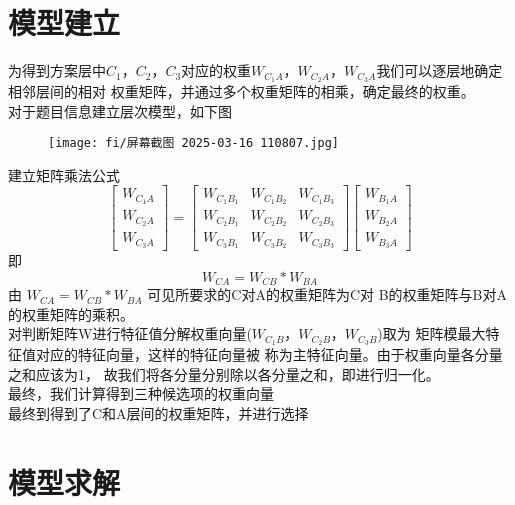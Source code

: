 \documentclass{article}
\begin{document}
\section{模型建立}
为得到方案层中$C_1$，$C_2$，$C_3$对应的权重$W_{C_1A}$，$W_{C_2A}$，$W_{C_3A}$我们可以逐层地确定相邻层间的相对
权重矩阵，并通过多个权重矩阵的相乘，确定最终的权重。
\\ \indent 对于题目信息建立层次模型，如下图
\begin{figure}[h]
    \centering
    \texttt{[image: fi/屏幕截图 2025-03-16 110807.jpg]}
\end{figure}
建立矩阵乘法公式
\begin{equation}
    \left[
    \begin{array}{c}
    W_{C_1A} \\
    W_{C_2A} \\
    W_{C_3A}
    \end{array}
    \right]
    =
    \left[
    \begin{array}{ccc}
    W_{C_1B_1} & W_{C_1B_2} & W_{C_1B_3} \\
    W_{C_2B_1} & W_{C_2B_2} & W_{C_2B_3} \\
    W_{C_3B_1} & W_{C_3B_2} & W_{C_3B_3}
    \end{array}
    \right]
    \left[
    \begin{array}{c}
    W_{B_1A} \\ 
    W_{B_2A} \\
    W_{B_3A}
    \end{array}
    \right]
    \end{equation}
即
\begin{equation}
  W_{CA}=W_{CB}*W_{BA}
\end{equation}
由 $W_{CA}=W_{CB}*W_{BA}$ 可见所要求的C对A的权重矩阵为C对
B的权重矩阵与B对A的权重矩阵的乘积。
\\ \indent 对判断矩阵W进行特征值分解权重向量($W_{C_1B}$，$W_{C_2B}$，$W_{C_3B}$)取为
矩阵模最大特征值对应的特征向量，这样的特征向量被
称为主特征向量。由于权重向量各分量之和应该为1，
故我们将各分量分别除以各分量之和，即进行归一化。
\\ \indent 最终，我们计算得到三种候选项的权重向量
\\ \indent 最终到得到了C和A层间的权重矩阵，并进行选择
\section{模型求解}
\end{document}
